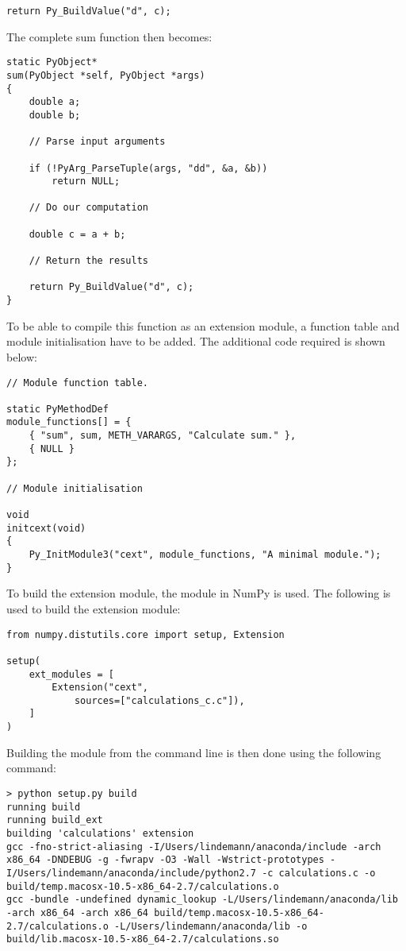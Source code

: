 \begin{lstlisting}
return Py_BuildValue("d", c);
\end{lstlisting}

The complete sum function then becomes:

\begin{lstlisting}
static PyObject* 
sum(PyObject *self, PyObject *args)
{
    double a;
    double b;

    // Parse input arguments

    if (!PyArg_ParseTuple(args, "dd", &a, &b))
        return NULL;

    // Do our computation

    double c = a + b;

    // Return the results

    return Py_BuildValue("d", c);
}
\end{lstlisting}

To be able to compile this function as an extension module, a function table and module initialisation have to be added. The additional code required is shown below:

\begin{lstlisting}
// Module function table.

static PyMethodDef
module_functions[] = {
    { "sum", sum, METH_VARARGS, "Calculate sum." },
    { NULL }
};

// Module initialisation

void
initcext(void)
{
    Py_InitModule3("cext", module_functions, "A minimal module.");
}
\end{lstlisting}

To build the extension module, the  module in NumPy is used. The following  is used to build the extension module:

\pymode

\begin{lstlisting}
from numpy.distutils.core import setup, Extension

setup(
	ext_modules = [
		Extension("cext",
			sources=["calculations_c.c"]),
	]
)\end{lstlisting}

Building the module from the command line is then done using the following command:

\cmdmode

\begin{lstlisting}
> python setup.py build
running build
running build_ext
building 'calculations' extension
gcc -fno-strict-aliasing -I/Users/lindemann/anaconda/include -arch x86_64 -DNDEBUG -g -fwrapv -O3 -Wall -Wstrict-prototypes -I/Users/lindemann/anaconda/include/python2.7 -c calculations.c -o build/temp.macosx-10.5-x86_64-2.7/calculations.o
gcc -bundle -undefined dynamic_lookup -L/Users/lindemann/anaconda/lib -arch x86_64 -arch x86_64 build/temp.macosx-10.5-x86_64-2.7/calculations.o -L/Users/lindemann/anaconda/lib -o build/lib.macosx-10.5-x86_64-2.7/calculations.so
\end{lstlisting}

